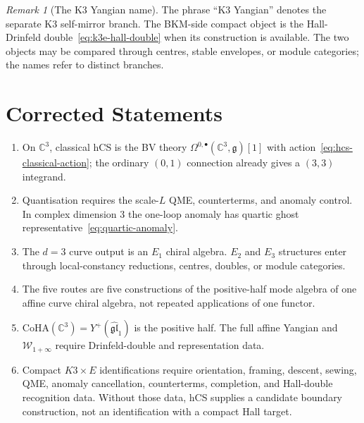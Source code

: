 \documentclass[11pt]{article}
\theoremstyle{remark}
\newtheorem{remark}[theorem]{Remark}
\providecommand{\C}{\mathbb{C}}
\providecommand{\cW}{\mathcal{W}}
\providecommand{\frakg}{\mathfrak{g}}
\providecommand{\fgl}{\mathfrak{gl}}
\providecommand{\Eone}{E_1}
\providecommand{\Etwo}{E_2}
\providecommand{\Ethree}{E_3}
\providecommand{\CoHA}{\mathrm{CoHA}}
\providecommand{\Yplus}{Y^+}
\begin{document}
\begin{remark}[The K3 Yangian name]
The phrase ``K3 Yangian'' denotes the separate K3 self-mirror branch.
The BKM-side compact object is the Hall-Drinfeld
double~\eqref{eq:k3e-hall-double} when its construction is available.
The two objects may be compared through centres, stable envelopes, or
module categories; the names refer to distinct branches.
\end{remark}

\section{Corrected Statements}

\begin{enumerate}[label=\textup{(\arabic*)}]
  \item On $\C^3$, classical hCS is the BV theory
  $\Omega^{0,\bullet}(\C^3,\frakg)[1]$ with
  action~\eqref{eq:hcs-classical-action}; the ordinary $(0,1)$ connection
  already gives a $(3,3)$ integrand.
  \item Quantisation requires the scale-$L$ QME, counterterms, and
  anomaly control.  In complex dimension $3$ the one-loop anomaly has
  quartic ghost representative~\eqref{eq:quartic-anomaly}.
  \item The $d=3$ curve output is an $\Eone$ chiral algebra.  $\Etwo$
  and $\Ethree$ structures enter through local-constancy reductions,
  centres, doubles, or module categories.
  \item The five routes are five constructions of the positive-half
  mode algebra of one affine curve chiral algebra, not repeated
  applications of one functor.
  \item $\CoHA(\C^3)=\Yplus(\widehat{\fgl}_1)$ is the positive half.
  The full affine Yangian and $\cW_{1+\infty}$ require
  Drinfeld-double and representation data.
  \item Compact $K3\times E$ identifications require orientation,
  framing, descent, sewing, QME, anomaly cancellation, counterterms,
  completion, and Hall-double recognition data.  Without those data,
  hCS supplies a candidate boundary construction, not an identification
  with a compact Hall target.
\end{enumerate}
\end{document}
